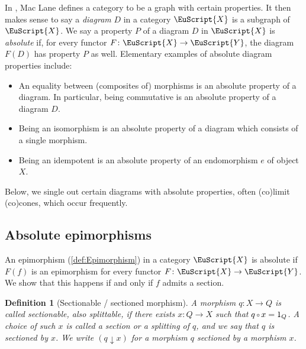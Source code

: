 \documentclass [12pt,oneside]{book}%
\theoremstyle{captionstyle}  %
\newtheorem{definition}[theorem]{Definition}
\newenvironment{ulist}{			%
	\begin{itemize}}{
	\end{itemize}
}
\newcommand{\IndSep}{\qquad}
\newcommand{\Defn}[1]{\emph{#1}}
\newcommand{\from}{\colon}				%
\newcommand{\Comp}{\raisebox{0.1ex}{\ensuremath{\,\scriptstyle{\circ}}\,}}
\newcommand{\IdMapOn}[1]{1_{#1}}	%
\newcommand{\SctndEpi}[2]{{(#1\downarrow #2)}}				%
\newcommand{\Ctgry}[1]{\EuScript{#1}}					%
\begin{document}
In \cite[I.1]{SMacLane1998}, Mac Lane defines a category to be a graph with certain properties. It then makes sense to say a \Defn{diagram} $D$ in a category $\Ctgry{X}$ is a subgraph of $\Ctgry{X}$. We say a property $P$ of a diagram $D$ in $\Ctgry{X}$ is \Defn{absolute} if, for every functor $F\from \Ctgry{X}\to \Ctgry{Y}$, the diagram $F(D)$ has property $P$ as well. Elementary examples of absolute diagram properties include: %
%
\begin{ulist}
    \item An equality between (composites of) morphisms is an absolute property of a diagram. In particular, being commutative is an absolute property of a diagram $D$.
    \item Being an isomorphism is an absolute property of a diagram which consists of a single morphism.
    \item Being an idempotent is an absolute property of an endomorphism $e$ of object $X$.
\end{ulist}

Below, we single out certain diagrams with absolute properties, often (co)limit (co)cones, which occur frequently.

\subsection{Absolute epimorphisms}
\label{subsec:AbsoluteEpis}%
An epimorphism (\ref{def:Epimorphism}) in a category $\Ctgry{X}$ is absolute if $F(f)$ is an epimorphism for every functor $F\from \Ctgry{X}\to \Ctgry{Y}$. We show that this happens if and only if $f$ admits a section. %
%

\begin{definition}[Sectionable / sectioned morphism]
    \label{def:SectionedEpimorphism}
    A morphism $q\from X\to Q$ is called \Defn{sectionable}, also \Defn{splittable}, if there exists $x\from Q\to X$ such that $q\Comp x=\IdMapOn{Q}$. A choice of such $x$ is called a \Defn{section} or a \Defn{splitting} of $q$, and we say that $q$ is sectioned by $x$. We write $\SctndEpi{q}{x}$ for a morphism $q$ sectioned by a morphism $x$.%
    \index[not]{s!$\SctndEpi{q}{x}$\IndSep map $q$ sectioned by $x$}
\end{definition}
\end{document}
